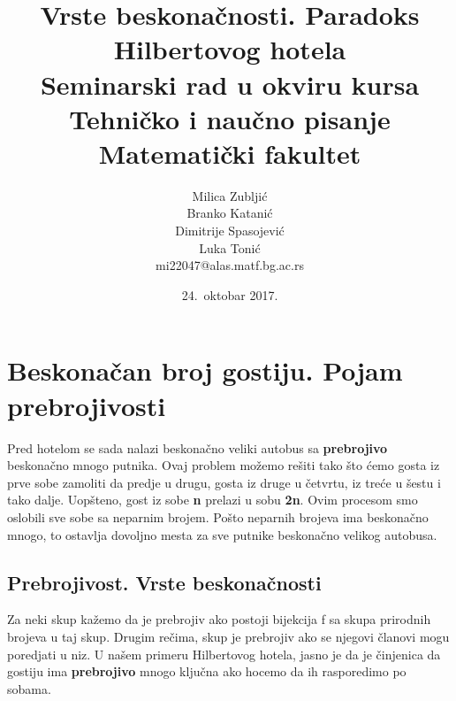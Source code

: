 \documentclass[a4paper]{article}
\begin{document}
\title{Vrste beskonačnosti. Paradoks Hilbertovog hotela\\ \small{Seminarski rad u okviru kursa\\Tehničko i naučno pisanje\\ Matematički fakultet}}

\author{Milica Zubljić\\ Branko Katanić\\ Dimitrije Spasojević\\ Luka Tonić\\ mi22047@alas.matf.bg.ac.rs}
\date{24.~oktobar 2017.} %
\maketitle


\tableofcontents %

\newpage
\section{Beskonačan broj gostiju. Pojam prebrojivosti}
\label{sec:beskonačan broj gostiju}
Pred hotelom se sada nalazi beskonačno veliki autobus sa \textbf {prebrojivo} beskonačno mnogo putnika.
Ovaj problem možemo rešiti tako što ćemo gosta iz prve sobe zamoliti da predje u drugu, gosta iz druge u četvrtu, iz treće u šestu i tako dalje.
Uopšteno, gost iz sobe \textbf {n} prelazi u sobu \textbf {2n}. Ovim procesom smo oslobili sve sobe sa neparnim brojem.
Pošto neparnih brojeva ima beskonačno mnogo, to ostavlja dovoljno mesta za sve putnike beskonačno velikog autobusa.
\subsection {Prebrojivost. Vrste beskonačnosti}
Za neki skup kažemo da je prebrojiv ako postoji bijekcija f sa skupa prirodnih brojeva u taj skup.
Drugim rečima, skup je prebrojiv ako se njegovi članovi mogu poredjati u niz.
U našem primeru Hilbertovog hotela, jasno je da je činjenica da gostiju ima \textbf {prebrojivo} mnogo ključna ako hocemo da ih rasporedimo po sobama.
\end{document}
